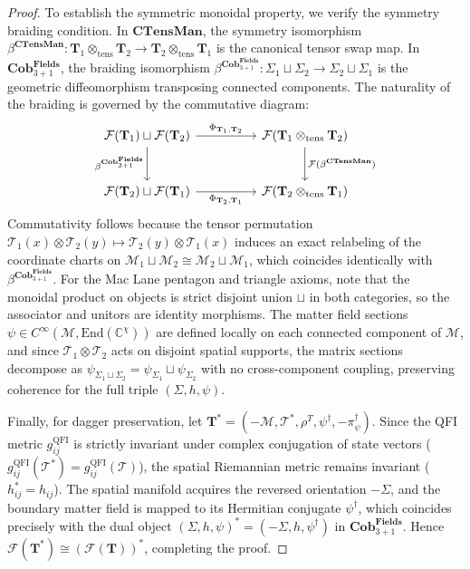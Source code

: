 \documentclass[11pt,a4paper,reqno]{amsart}
\theoremstyle{definition}
\numberwithin{equation}{section}
\newcommand{\CTens}{\mathbf{CTensMan}}
\newcommand{\Cob}{\mathbf{Cob}_{3+1}^{\mathbf{Fields}}}
\newcommand{\QFI}{\mathrm{QFI}}
\begin{document}
\begin{proof}
To establish the symmetric monoidal property, we verify the symmetry braiding condition. In $\CTens$, the symmetry isomorphism $\beta^{\CTens}: \mathbf{T}_1 \otimes_{\mathrm{tens}} \mathbf{T}_2 \to \mathbf{T}_2 \otimes_{\mathrm{tens}} \mathbf{T}_1$ is the canonical tensor swap map. In $\Cob$, the braiding isomorphism $\beta^{\Cob}: \Sigma_1 \sqcup \Sigma_2 \to \Sigma_2 \sqcup \Sigma_1$ is the geometric diffeomorphism transposing connected components. The naturality of the braiding is governed by the commutative diagram:
\begin{equation}
\begin{tikzcd}[column sep=huge, row sep=large]
\mathcal{F}(\mathbf{T}_1) \sqcup \mathcal{F}(\mathbf{T}_2) \arrow[r, "\Phi_{\mathbf{T}_1, \mathbf{T}_2}"] \arrow[d, "\beta^{\Cob}"'] & \mathcal{F}(\mathbf{T}_1 \otimes_{\mathrm{tens}} \mathbf{T}_2) \arrow[d, "\mathcal{F}(\beta^{\CTens})"] \\
\mathcal{F}(\mathbf{T}_2) \sqcup \mathcal{F}(\mathbf{T}_1) \arrow[r, "\Phi_{\mathbf{T}_2, \mathbf{T}_1}"'] & \mathcal{F}(\mathbf{T}_2 \otimes_{\mathrm{tens}} \mathbf{T}_1)
\end{tikzcd}
\end{equation}
Commutativity follows because the tensor permutation $\mathcal{T}_1(x) \otimes \mathcal{T}_2(y) \mapsto \mathcal{T}_2(y) \otimes \mathcal{T}_1(x)$ induces an exact relabeling of the coordinate charts on $\mathcal{M}_1 \sqcup \mathcal{M}_2 \cong \mathcal{M}_2 \sqcup \mathcal{M}_1$, which coincides identically with $\beta^{\Cob}$. For the Mac Lane pentagon and triangle axioms, note that the monoidal product on objects is strict disjoint union $\sqcup$ in both categories, so the associator and unitors are identity morphisms. The matter field sections $\psi \in C^\infty(\mathcal{M}, \mathrm{End}(\mathbb{C}^\chi))$ are defined locally on each connected component of $\mathcal{M}$, and since $\mathcal{T}_1 \otimes \mathcal{T}_2$ acts on disjoint spatial supports, the matrix sections decompose as $\psi_{\Sigma_1 \sqcup \Sigma_2} = \psi_{\Sigma_1} \sqcup \psi_{\Sigma_2}$ with no cross-component coupling, preserving coherence for the full triple $(\Sigma, h, \psi)$.

Finally, for dagger preservation, let $\mathbf{T}^* = (-\mathcal{M}, \mathcal{T}^*, \rho^T, \psi^\dagger, -\pi_\psi^\dagger)$. Since the QFI metric $g^{\QFI}_{ij}$ is strictly invariant under complex conjugation of state vectors ($g^{\QFI}_{ij}(\mathcal{T}^*) = g^{\QFI}_{ij}(\mathcal{T})$), the spatial Riemannian metric remains invariant ($h_{ij}^* = h_{ij}$). The spatial manifold acquires the reversed orientation $-\Sigma$, and the boundary matter field is mapped to its Hermitian conjugate $\psi^\dagger$, which coincides precisely with the dual object $(\Sigma, h, \psi)^* = (-\Sigma, h, \psi^\dagger)$ in $\Cob$. Hence $\mathcal{F}(\mathbf{T}^*) \cong (\mathcal{F}(\mathbf{T}))^*$, completing the proof.
\end{proof}
\end{document}
